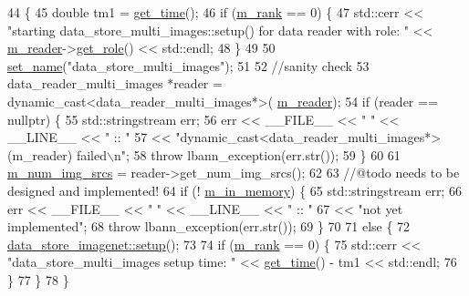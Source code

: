 \begin{DoxyCode}
44                                     \{
45   \textcolor{keywordtype}{double} tm1 = \hyperlink{namespacelbann_a478d36031ff0659893c4322cd856157f}{get\_time}();
46   \textcolor{keywordflow}{if} (\hyperlink{classlbann_1_1generic__data__store_a87695bfd2d1ed0dbe01d99108e3f68b7}{m\_rank} == 0) \{
47     std::cerr << \textcolor{stringliteral}{"starting data\_store\_multi\_images::setup() for data reader with role: "} << 
      \hyperlink{classlbann_1_1generic__data__store_afa49ced0ab64c632371ea52532a91ec2}{m\_reader}->\hyperlink{classlbann_1_1generic__data__reader_a92982e1b399f37e2ead5aa440883cba5}{get\_role}() << std::endl;
48   \}
49 
50   \hyperlink{classlbann_1_1generic__data__store_a853741295a07b5687921fc56d0d7d5b2}{set\_name}(\textcolor{stringliteral}{"data\_store\_multi\_images"});
51 
52   \textcolor{comment}{//sanity check}
53   data\_reader\_multi\_images *reader = \textcolor{keyword}{dynamic\_cast<}data\_reader\_multi\_images*\textcolor{keyword}{>}(
      \hyperlink{classlbann_1_1generic__data__store_afa49ced0ab64c632371ea52532a91ec2}{m\_reader});
54   \textcolor{keywordflow}{if} (reader == \textcolor{keyword}{nullptr}) \{
55     std::stringstream err;
56     err << \_\_FILE\_\_ << \textcolor{stringliteral}{" "} << \_\_LINE\_\_ << \textcolor{stringliteral}{" :: "}
57         << \textcolor{stringliteral}{"dynamic\_cast<data\_reader\_multi\_images*>(m\_reader) failed\(\backslash\)n"};
58     \textcolor{keywordflow}{throw} lbann\_exception(err.str());
59   \}
60 
61   \hyperlink{classlbann_1_1data__store__image_a2f660053e7621a9cc70a7c4eef53c9cc}{m\_num\_img\_srcs} = reader->get\_num\_img\_srcs();
62 
63   \textcolor{comment}{//@todo needs to be designed and implemented!}
64   \textcolor{keywordflow}{if} (! \hyperlink{classlbann_1_1generic__data__store_a1a9cc7b097cd7dd6ae0d12d52bb43ea1}{m\_in\_memory}) \{
65     std::stringstream err;
66     err << \_\_FILE\_\_ << \textcolor{stringliteral}{" "} << \_\_LINE\_\_ << \textcolor{stringliteral}{" :: "}
67         << \textcolor{stringliteral}{"not yet implemented"};
68     \textcolor{keywordflow}{throw} lbann\_exception(err.str());
69   \} 
70   
71   \textcolor{keywordflow}{else} \{
72     \hyperlink{classlbann_1_1data__store__imagenet_a611aa1734a491c443396a077b49fe4fe}{data\_store\_imagenet::setup}();
73 
74     \textcolor{keywordflow}{if} (\hyperlink{classlbann_1_1generic__data__store_a87695bfd2d1ed0dbe01d99108e3f68b7}{m\_rank} == 0) \{
75       std::cerr << \textcolor{stringliteral}{"data\_store\_multi\_images setup time: "} << \hyperlink{namespacelbann_a478d36031ff0659893c4322cd856157f}{get\_time}() - tm1 << std::endl;
76     \}
77   \}
78 \}
\end{DoxyCode}
